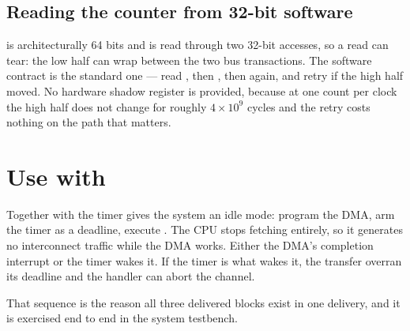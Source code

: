 \subsection{Reading the counter from 32-bit software}

 is architecturally 64 bits and is read through two 32-bit accesses,
so a read can tear: the low half can wrap between the two bus transactions. The
software contract is the standard one --- read , then
, then  again, and retry if the high half moved.
No hardware shadow register is provided, because at one count per clock the high
half does not change for roughly $4\times10^{9}$ cycles and the retry costs
nothing on the path that matters.

\section{Use with }

Together with  the timer gives the system an idle mode: program the DMA,
arm the timer as a deadline, execute . The CPU stops fetching entirely,
so it generates no interconnect traffic while the DMA works. Either the DMA's
completion interrupt or the timer wakes it. If the timer is what wakes it, the
transfer overran its deadline and the handler can abort the channel.

That sequence is the reason all three delivered blocks exist in one delivery, and
it is exercised end to end in the system testbench.
